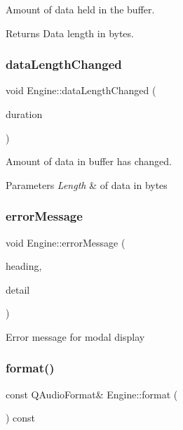 Amount of data held in the buffer. \begin{DoxyReturn}{Returns}
Data length in bytes. 
\end{DoxyReturn}
\hypertarget{class_engine_a3316fdfd7db81a74416b8180c264f361}{}\label{class_engine_a3316fdfd7db81a74416b8180c264f361} 
\subsubsection{\texorpdfstring{data\+Length\+Changed}{dataLengthChanged}}
{\footnotesize\ttfamily void Engine\+::data\+Length\+Changed (\begin{DoxyParamCaption}\item[{qint64}]{duration }\end{DoxyParamCaption})\hspace{0.3cm}{\ttfamily [signal]}}

Amount of data in buffer has changed. 
\begin{DoxyParams}{Parameters}
{\em Length} & of data in bytes \\
\hline
\end{DoxyParams}
\hypertarget{class_engine_a15540c6090eaa691b572d89d45d72e35}{}\label{class_engine_a15540c6090eaa691b572d89d45d72e35} 
\subsubsection{\texorpdfstring{error\+Message}{errorMessage}}
{\footnotesize\ttfamily void Engine\+::error\+Message (\begin{DoxyParamCaption}\item[{const Q\+String \&}]{heading,  }\item[{const Q\+String \&}]{detail }\end{DoxyParamCaption})\hspace{0.3cm}{\ttfamily [signal]}}

Error message for modal display \hypertarget{class_engine_a275e6b498d8d956e10bdeeef9c494673}{}\label{class_engine_a275e6b498d8d956e10bdeeef9c494673} 
\subsubsection{\texorpdfstring{format()}{format()}}
{\footnotesize\ttfamily const Q\+Audio\+Format\& Engine\+::format (\begin{DoxyParamCaption}{ }\end{DoxyParamCaption}) const\hspace{0.3cm}{\ttfamily [inline]}}

